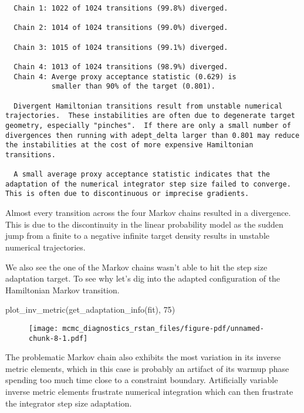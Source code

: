 \documentclass[
  letterpaper,
  DIV=11,
  numbers=noendperiod]{scrartcl}
\newenvironment{Shaded}{\begin{snugshade}}{\end{snugshade}}
\newcommand{\DecValTok}[1]{\textcolor[rgb]{0.68,0.00,0.00}{#1}}
\newcommand{\FunctionTok}[1]{\textcolor[rgb]{0.28,0.35,0.67}{#1}}
\newcommand{\NormalTok}[1]{\textcolor[rgb]{0.00,0.23,0.31}{#1}}
\begin{document}
\begin{verbatim}
  Chain 1: 1022 of 1024 transitions (99.8%) diverged.

  Chain 2: 1014 of 1024 transitions (99.0%) diverged.

  Chain 3: 1015 of 1024 transitions (99.1%) diverged.

  Chain 4: 1013 of 1024 transitions (98.9%) diverged.
  Chain 4: Averge proxy acceptance statistic (0.629) is
           smaller than 90% of the target (0.801).

  Divergent Hamiltonian transitions result from unstable numerical
trajectories.  These instabilities are often due to degenerate target
geometry, especially "pinches".  If there are only a small number of
divergences then running with adept_delta larger than 0.801 may reduce
the instabilities at the cost of more expensive Hamiltonian
transitions.

  A small average proxy acceptance statistic indicates that the
adaptation of the numerical integrator step size failed to converge.
This is often due to discontinuous or imprecise gradients.
\end{verbatim}

Almost every transition across the four Markov chains resulted in a
divergence. This is due to the discontinuity in the linear probability
model as the sudden jump from a finite to a negative infinite target
density results in unstable numerical trajectories.

We also see the one of the Markov chains wasn't able to hit the step
size adaptation target. To see why let's dig into the adapted
configuration of the Hamiltonian Markov transition.

\begin{Shaded}
\begin{Highlighting}[]
\FunctionTok{plot\_inv\_metric}\NormalTok{(}\FunctionTok{get\_adaptation\_info}\NormalTok{(fit), }\DecValTok{75}\NormalTok{)}
\end{Highlighting}
\end{Shaded}

\begin{figure}[H]

{\centering \texttt{[image: mcmc\_diagnostics\_rstan\_files/figure-pdf/unnamed-chunk-8-1.pdf]}

}

\end{figure}

The problematic Markov chain also exhibits the most variation in its
inverse metric elements, which in this case is probably an artifact of
its warmup phase spending too much time close to a constraint boundary.
Artificially variable inverse metric elements frustrate numerical
integration which can then frustrate the integrator step size
adaptation.
\end{document}

